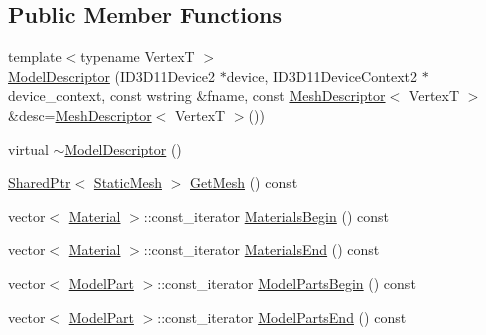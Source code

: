 \subsection*{Public Member Functions}
\begin{DoxyCompactItemize}
\item 
{\footnotesize template$<$typename VertexT $>$ }\\\hyperlink{classmage_1_1_model_descriptor_a1ae1d85907be96350cef77e6a4ba4fb9}{Model\+Descriptor} (I\+D3\+D11\+Device2 $\ast$device, I\+D3\+D11\+Device\+Context2 $\ast$device\+\_\+context, const wstring \&fname, const \hyperlink{structmage_1_1_mesh_descriptor}{Mesh\+Descriptor}$<$ VertexT $>$ \&desc=\hyperlink{structmage_1_1_mesh_descriptor}{Mesh\+Descriptor}$<$ VertexT $>$())
\item 
virtual \hyperlink{classmage_1_1_model_descriptor_a3bc8ee3d1cb8d2675374727edce3d593}{$\sim$\+Model\+Descriptor} ()
\item 
\hyperlink{namespacemage_a1e01ae66713838a7a67d30e44c67703e}{Shared\+Ptr}$<$ \hyperlink{classmage_1_1_static_mesh}{Static\+Mesh} $>$ \hyperlink{classmage_1_1_model_descriptor_a0781eed81d27ed936503056bbd46ab58}{Get\+Mesh} () const
\item 
vector$<$ \hyperlink{structmage_1_1_material}{Material} $>$\+::const\+\_\+iterator \hyperlink{classmage_1_1_model_descriptor_a64a2ca531c03cd8d79eda3a728e6efa1}{Materials\+Begin} () const
\item 
vector$<$ \hyperlink{structmage_1_1_material}{Material} $>$\+::const\+\_\+iterator \hyperlink{classmage_1_1_model_descriptor_a3e1880190d58d4d1bc308766f804047d}{Materials\+End} () const
\item 
vector$<$ \hyperlink{structmage_1_1_model_part}{Model\+Part} $>$\+::const\+\_\+iterator \hyperlink{classmage_1_1_model_descriptor_a721a81fae1d5613af8a3a037577ce454}{Model\+Parts\+Begin} () const
\item 
vector$<$ \hyperlink{structmage_1_1_model_part}{Model\+Part} $>$\+::const\+\_\+iterator \hyperlink{classmage_1_1_model_descriptor_a97f78d3e5a157020f62f5e6003deaac6}{Model\+Parts\+End} () const
\end{DoxyCompactItemize}
